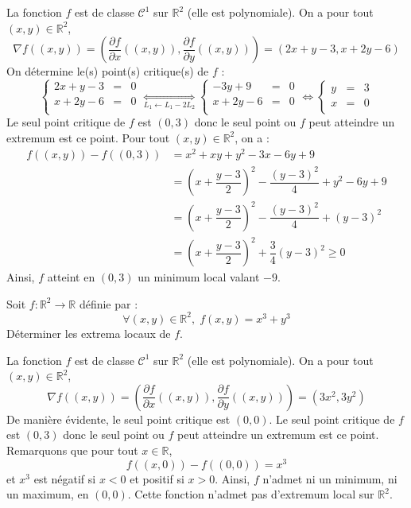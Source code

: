\documentclass[a4paper,10pt]{report}
\begin{document}
\corr La fonction $f$ est de classe $\mathcal{C}^1$ sur $\mathbb{R}^2$ (elle est polynomiale). On a pour tout $(x,y) \in \mathbb{R}^2$,
$$ \nabla f ((x,y)) = \left( \dfrac{\partial f}{\partial x} ((x,y)),  \dfrac{\partial f}{\partial y} ((x,y)) \right) = (2x+y-3,x+2y-6)$$
On détermine le(s) point(s) critique(s) de $f$ :
$$ \left\lbrace \begin{array}{ccl}
2x+y-3 & = &0 \\
x+2y-6 & =& 0 \\
\end{array}\right. \underset{L_1 \leftarrow L_1-2L_2}{\Longleftrightarrow}\left\lbrace \begin{array}{ccl}
-3y+9 & =& 0 \\
x+2y-6 & =& 0 \\
\end{array}\right. \Longleftrightarrow \left\lbrace \begin{array}{ccl}
y & = & 3 \\
x & =  & 0 \\
\end{array}\right.$$
Le seul point critique de $f$ est $(0,3)$ donc le seul point ou $f$ peut atteindre un extremum est ce point. Pour tout $(x,y) \in \mathbb{R}^2$, on a :
\begin{align*}
 f((x,y)) - f((0,3)) & = x^{2} + xy + y^{2} - 3x - 6y + 9 \\
 & = \left( x + \dfrac{y-3}{2} \right)^2 - \dfrac{(y-3)^2}{4} + y^2-6y+9 \\
 & = \left( x + \dfrac{y-3}{2} \right)^2 - \dfrac{(y-3)^2}{4} + (y-3)^2 \\
 & = \left( x + \dfrac{y-3}{2} \right)^2 + \dfrac{3}{4} (y-3)^2 \geq 0
 \end{align*}
 Ainsi, $f$ atteint en $(0,3)$ un minimum local valant $-9$.
 
 
 \begin{Exercice}{} Soit $f : \mathbb{R}^2 \rightarrow \mathbb{R}$ définie par :
$$ \forall (x,y) \in \mathbb{R}^2, \; f(x,y) = x^3+y^3$$
Déterminer les extrema locaux de $f$.
\end{Exercice}

\corr La fonction $f$ est de classe $\mathcal{C}^1$ sur $\mathbb{R}^2$ (elle est polynomiale). On a pour tout $(x,y) \in \mathbb{R}^2$,
$$ \nabla f ((x,y)) = \left( \dfrac{\partial f}{\partial x} ((x,y)),  \dfrac{\partial f}{\partial y} ((x,y)) \right) = (3x^2,3y^2)$$
De manière évidente, le seul point critique est $(0,0)$. Le seul point critique de $f$ est $(0,3)$ donc le seul point ou $f$ peut atteindre un extremum est ce point. Remarquons que pour tout $x \in \mathbb{R}$,
$$ f((x,0))-f((0,0)) = x^3$$
et $x^3$ est négatif si $x<0$ et positif si $x>0$. Ainsi, $f$ n'admet ni un minimum, ni un maximum, en $(0,0)$. Cette fonction n'admet pas d'extremum local sur $\mathbb{R}^2$.
 
\end{document}
